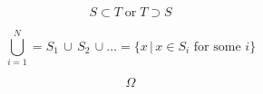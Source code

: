 \[\begin{equation} S \subset T \; \text{or} \; T \supset S \end{equation}\]

\[\begin{equation} \bigcup_{i=1}^N = S_1 \, \cup \, S_2 \, \cup \dotso = \{ x \, | \, x \in S_i \text{ for some } i\} \end{equation}\]

\[\begin{equation} \Omega \end{equation}\]
